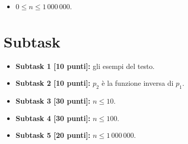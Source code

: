 


\begin{itemize}[nolistsep, noitemsep]
  \item $0 \le n \le 1\,000\,000$.
\end{itemize}

  \section*{Subtask}
  \begin{itemize}
    \item \textbf{Subtask 1 [10 punti]:} gli esempi del testo.
    \item \textbf{Subtask 2 [10 punti]:} $p_2$ è la funzione inversa di $p_1$.
    \item \textbf{Subtask 3 [30 punti]:} $n \leq 10$.
    \item \textbf{Subtask 4 [30 punti]:} $n \leq 100$.
    \item \textbf{Subtask 5 [20 punti]:} $n \leq 1\,000\,000$.
  \end{itemize}
  
